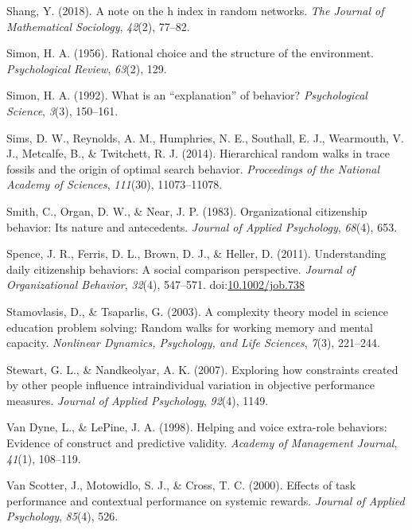 \documentclass[english,,man]{apa6}
\theoremstyle{definition}
\theoremstyle{definition}
\theoremstyle{definition}
\theoremstyle{remark}
\begin{document}
\leavevmode\hypertarget{ref-shang2018note}{}%
Shang, Y. (2018). A note on the h index in random networks. \emph{The
Journal of Mathematical Sociology}, \emph{42}(2), 77--82.

\leavevmode\hypertarget{ref-simon_rational_1956}{}%
Simon, H. A. (1956). Rational choice and the structure of the
environment. \emph{Psychological Review}, \emph{63}(2), 129.

\leavevmode\hypertarget{ref-simon_what_1992}{}%
Simon, H. A. (1992). What is an ``explanation'' of behavior?
\emph{Psychological Science}, \emph{3}(3), 150--161.

\leavevmode\hypertarget{ref-sims2014hierarchical}{}%
Sims, D. W., Reynolds, A. M., Humphries, N. E., Southall, E. J.,
Wearmouth, V. J., Metcalfe, B., \& Twitchett, R. J. (2014). Hierarchical
random walks in trace fossils and the origin of optimal search behavior.
\emph{Proceedings of the National Academy of Sciences}, \emph{111}(30),
11073--11078.

\leavevmode\hypertarget{ref-smith1983organizational}{}%
Smith, C., Organ, D. W., \& Near, J. P. (1983). Organizational
citizenship behavior: Its nature and antecedents. \emph{Journal of
Applied Psychology}, \emph{68}(4), 653.

\leavevmode\hypertarget{ref-spence_understanding_2011}{}%
Spence, J. R., Ferris, D. L., Brown, D. J., \& Heller, D. (2011).
Understanding daily citizenship behaviors: A social comparison
perspective. \emph{Journal of Organizational Behavior}, \emph{32}(4),
547--571. doi:\href{https://doi.org/10.1002/job.738}{10.1002/job.738}

\leavevmode\hypertarget{ref-stamovlasis2003complexity}{}%
Stamovlasis, D., \& Tsaparlis, G. (2003). A complexity theory model in
science education problem solving: Random walks for working memory and
mental capacity. \emph{Nonlinear Dynamics, Psychology, and Life
Sciences}, \emph{7}(3), 221--244.

\leavevmode\hypertarget{ref-stewart2007exploring}{}%
Stewart, G. L., \& Nandkeolyar, A. K. (2007). Exploring how constraints
created by other people influence intraindividual variation in objective
performance measures. \emph{Journal of Applied Psychology},
\emph{92}(4), 1149.

\leavevmode\hypertarget{ref-van1998helping}{}%
Van Dyne, L., \& LePine, J. A. (1998). Helping and voice extra-role
behaviors: Evidence of construct and predictive validity. \emph{Academy
of Management Journal}, \emph{41}(1), 108--119.

\leavevmode\hypertarget{ref-van2000effects}{}%
Van Scotter, J., Motowidlo, S. J., \& Cross, T. C. (2000). Effects of
task performance and contextual performance on systemic rewards.
\emph{Journal of Applied Psychology}, \emph{85}(4), 526.
\end{document}
